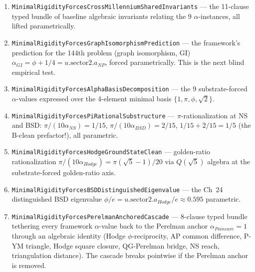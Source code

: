 \begin{enumerate}
\item \texttt{Minimal\allowbreak{}Rigidity\allowbreak{}Forces\allowbreak{}Cross\allowbreak{}Millennium\allowbreak{}Shared\allowbreak{}Invariants}
--- the 11-clause typed bundle of baseline algebraic invariants
relating the 9 $\alpha$-instances, all lifted parametrically.

\item \texttt{Minimal\allowbreak{}Rigidity\allowbreak{}Forces\allowbreak{}Graph\allowbreak{}Isomorphism\allowbreak{}Prediction} ---
the framework's prediction for the 144th problem (graph
isomorphism, GI) $\alpha_{GI} = \phi + 1/4 = u.\mathrm{sector2}.a_{NP}$,
forced parametrically. This is the next blind empirical test.

\item \texttt{Minimal\allowbreak{}Rigidity\allowbreak{}Forces\allowbreak{}Alpha\allowbreak{}Basis\allowbreak{}Decomposition} ---
the 9 substrate-forced $\alpha$-values expressed over the
4-element minimal basis $\{1, \pi, \phi, \sqrt{2}\}$.

\item \texttt{Minimal\allowbreak{}Rigidity\allowbreak{}Forces\allowbreak{}Pi\allowbreak{}Rational\allowbreak{}Substructure} ---
$\pi$-rationalization at NS and BSD:
$\pi/(10\alpha_{NS}) = 1/15$, $\pi/(10\alpha_{BSD}) = 2/15$,
$1/15 + 2/15 = 1/5$ (the B-clean prefactor!), all parametric.

\item \texttt{Minimal\allowbreak{}Rigidity\allowbreak{}Forces\allowbreak{}Hodge\allowbreak{}Ground\allowbreak{}State\allowbreak{}Clean} ---
golden-ratio rationalization
$\pi/(10\alpha_{Hodge}) = \pi(\sqrt{5}-1)/20$ via $Q(\sqrt{5})$
algebra at the substrate-forced golden-ratio axis.

\item \texttt{Minimal\allowbreak{}Rigidity\allowbreak{}Forces\allowbreak{}BSDDistinguished\allowbreak{}Eigenvalue} ---
the Ch~24 distinguished BSD eigenvalue
$\phi/e = u.\mathrm{sector2}.a_{Hodge}/e \approx 0.595$ parametric.

\item \texttt{Minimal\allowbreak{}Rigidity\allowbreak{}Forces\allowbreak{}Perelman\allowbreak{}Anchored\allowbreak{}Cascade} ---
8-clause typed bundle tethering every framework $\alpha$-value
back to the Perelman anchor $\alpha_{Poincar\acute{e}} = 1$
through an algebraic identity (Hodge $\phi$-reciprocity, AP
common difference, P-YM triangle, Hodge square closure,
QG-Perelman bridge, NS reach, triangulation distance). The
cascade breaks pointwise if the Perelman anchor is removed.


\end{enumerate}
